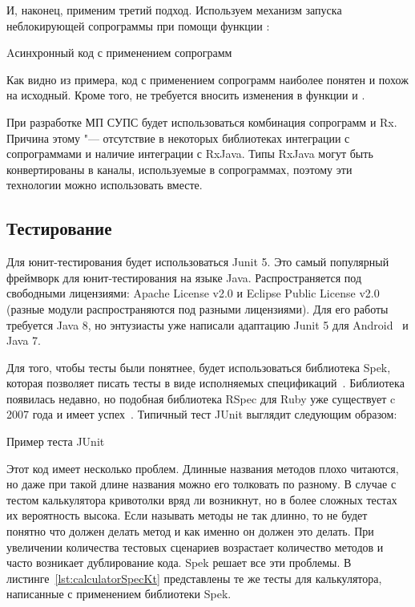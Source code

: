 И, наконец, применим третий подход.
Используем механизм запуска неблокирующей сопрограммы при помощи функции :

\begin{listing}[H]
  \caption{Aсинхронный код с применением сопрограмм}
  \label{lst:asyncKtCoroutines}
\end{listing}

Как видно из примера, код с применением сопрограмм наиболее понятен и похож на исходный.
Кроме того, не требуется вносить изменения в функции  и .

При разработке МП СУПС будет использоваться комбинация сопрограмм и Rx.
Причина этому "--- отсутствие в некоторых библиотеках интеграции с сопрограммами и наличие интеграции с RxJava.
Типы RxJava могут быть конвертированы в каналы, используемые в сопрограммах, поэтому эти технологии можно использовать вместе.

\subsection{Тестирование}
\label{subsec:testing}
Для юнит-тестирования будет использоваться Junit 5.
Это самый популярный фреймворк для юнит-тестирования на языке Java.
Распространяется под свободными лицензиями: Apache License v2.0 и Eclipse Public License v2.0 (разные модули распространяются под разными лицензиями).
Для его работы требуется Java 8, но энтузиасты уже написали адаптацию Junit 5 для Android~\cite{gihub:junit5Android} и Java 7.

Для того, чтобы тесты были понятнее, будет использоваться библиотека Spek, которая позволяет писать тесты в виде исполняемых спецификаций~\cite{spek:docs}.
Библиотека появилась недавно, но подобная библиотека RSpec для Ruby уже существует c 2007 года и имеет успех~\cite{rspec:about}.
Типичный тест JUnit выглядит следующим образом:

\begin{listing}[H]
  \caption{Пример теста JUnit}
  \label{lst:calculatorTestKt}
\end{listing}

Этот код имеет несколько проблем.
Длинные названия методов плохо читаются, но даже при такой длине названия можно его толковать по разному.
В случае с тестом калькулятора кривотолки вряд ли возникнут, но в более сложных тестах их вероятность высока.
Если называть методы не так длинно, то не будет понятно что должен делать метод и как именно он должен это делать.
При увеличении количества тестовых сценариев возрастает количество методов и часто возникает дублирование кода.
Spek решает все эти проблемы.
В листинге~\ref{lst:calculatorSpecKt} представлены те же тесты для калькулятора, написанные с применением библиотеки Spek.

